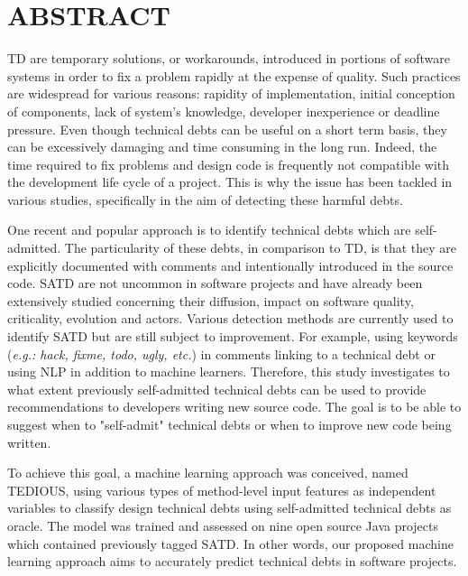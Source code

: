 %

\chapter*{ABSTRACT}\thispagestyle{headings}

\setlength{\parindent}{5ex} \ac{TD} are temporary solutions, or workarounds, introduced in portions of software systems in order to fix a problem rapidly at the expense of quality. Such practices are widespread for various reasons: rapidity of implementation, initial conception of components, lack of system's knowledge, developer inexperience or deadline pressure. Even though technical debts can be useful on a short term basis, they can be excessively damaging and time consuming in the long run. Indeed, the time required to fix problems and design code is frequently not compatible with the development life cycle of a project. This is why the issue has been tackled in various studies, specifically in the aim of detecting these harmful debts. \par

One recent and popular approach is to identify technical debts which are self-admitted. The particularity of these debts, in comparison to \ac{TD}, is that they are explicitly documented with comments and intentionally introduced in the source code. \ac{SATD} are not uncommon in software projects and have already been extensively studied concerning their diffusion, impact on software quality, criticality, evolution and actors. Various detection methods are currently used to identify \ac{SATD} but are still subject to improvement. For example, using keywords (\emph{e.g.: hack, fixme, todo, ugly, etc.}) in comments linking to a technical debt or using \ac{NLP} in addition to machine learners. Therefore, this study investigates to what extent previously self-admitted technical debts can be used to provide recommendations to developers writing new source code. The goal is to be able to suggest when to "self-admit" technical debts or when to improve new code being written. \par

To achieve this goal, a machine learning approach was conceived, named \ac{TEDIOUS}, using various types of method-level input features as independent variables to classify design technical debts using self-admitted technical debts as oracle. The model was trained and assessed on nine open source Java projects which contained previously tagged \ac{SATD}. In other words, our proposed machine learning approach aims to accurately predict technical debts in software projects. \par


